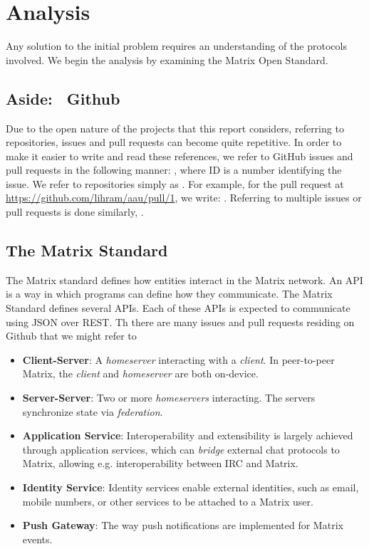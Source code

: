 \chapter{Analysis}
Any solution to the initial problem requires an understanding of the protocols involved.
We begin the analysis by examining the Matrix Open Standard.

\section*{Aside: \faGithub~Github}
Due to the open nature of the projects that this report considers, referring to repositories, issues and pull requests can become quite repetitive.
In order to make it easier to write and read these references, we refer to GitHub issues and pull requests in the following manner: , where ID is a number identifying the issue.
We refer to repositories simply as .
For example, for the pull request at \url{https://github.com/lihram/aau/pull/1}, we write: .
Referring to multiple issues or pull requests is done similarly, .

\section{The Matrix Standard}
The Matrix standard defines how entities interact in the Matrix network.
An \ac{API} is a way in which programs can define how they communicate.
The Matrix Standard defines several \ac{API}s.
Each of these \ac{API}s is expected to communicate using \ac{JSON} over \ac{REST}.
Th there are many issues and pull requests residing on Github that we might refer to
\begin{itemize}
    \item \textbf{Client-Server}: A \textit{homeserver} interacting with a \textit{client}. In peer-to-peer Matrix, the \textit{client} and \textit{homeserver} are both on-device.
    \item \textbf{Server-Server}: Two or more \textit{homeservers} interacting. The servers synchronize state via \textit{federation}.
    \item \textbf{Application Service}: Interoperability and extensibility is largely achieved through application services, which can \textit{bridge} external chat protocols to Matrix, allowing e.g. interoperability between \ac{IRC} and Matrix.
    \item \textbf{Identity Service}: Identity services enable external identities, such as email, mobile numbers, or other services to be attached to a Matrix user.
    \item \textbf{Push Gateway}: The way push notifications are implemented for Matrix events.
\end{itemize}

